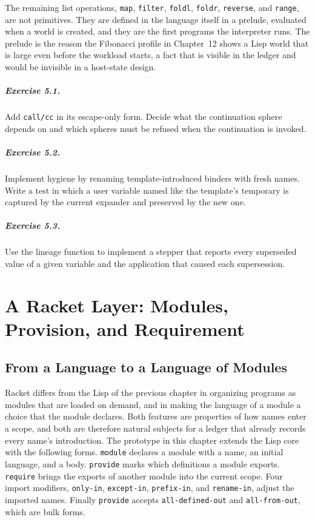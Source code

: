 \documentclass[11pt,oneside]{report}
\theoremstyle{plain}
\theoremstyle{definition}
\theoremstyle{remark}
\begin{document}
The remaining list operations, \texttt{map}, \texttt{filter}, \texttt{foldl}, \texttt{foldr}, \texttt{reverse}, and \texttt{range}, are not primitives. They are defined in the language itself in a prelude, evaluated when a world is created, and they are the first programs the interpreter runs. The prelude is the reason the Fibonacci profile in Chapter~12 shows a Lisp world that is large even before the workload starts, a fact that is visible in the ledger and would be invisible in a host-state design.

\paragraph{Exercise 5.1.} Add \texttt{call/cc} in its escape-only form. Decide what the continuation sphere depends on and which spheres must be refused when the continuation is invoked.

\paragraph{Exercise 5.2.} Implement hygiene by renaming template-introduced binders with fresh names. Write a test in which a user variable named like the template's temporary is captured by the current expander and preserved by the new one.

\paragraph{Exercise 5.3.} Use the lineage function to implement a stepper that reports every superseded value of a given variable and the application that caused each supersession.

\chapter{A Racket Layer: Modules, Provision, and Requirement}

\section{From a Language to a Language of Modules}

Racket \cite{racket-ref,flatt02} differs from the Lisp of the previous chapter in organizing programs as modules that are loaded on demand, and in making the language of a module a choice that the module declares. Both features are properties of how names enter a scope, and both are therefore natural subjects for a ledger that already records every name's introduction. The prototype in this chapter extends the Lisp core with the following forms. \texttt{module} declares a module with a name, an initial language, and a body. \texttt{provide} marks which definitions a module exports. \texttt{require} brings the exports of another module into the current scope. Four import modifiers, \texttt{only-in}, \texttt{except-in}, \texttt{prefix-in}, and \texttt{rename-in}, adjust the imported names. Finally \texttt{provide} accepts \texttt{all-defined-out} and \texttt{all-from-out}, which are bulk forms.
\end{document}
